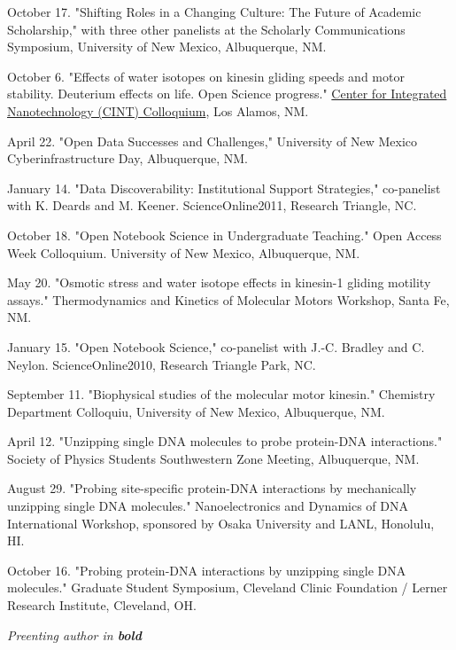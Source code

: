 \documentclass[11pt]{article}
\begin{document}
 October 17. "Shifting Roles in a Changing Culture: The Future of Academic Scholarship," with three other panelists at the Scholarly Communications Symposium, University of New Mexico, Albuquerque, NM.

 October 6. "Effects of water isotopes on kinesin gliding speeds and motor stability.  Deuterium effects on life.  Open Science progress." \href{http://goo.gl/XRjWQ}{Center for Integrated Nanotechnology (CINT) Colloquium}, Los Alamos, NM.

 April 22. "Open Data Successes and Challenges," University of New Mexico Cyberinfrastructure Day, Albuquerque, NM. 

 January 14. "Data Discoverability: Institutional Support Strategies," co-panelist with K. Deards and M. Keener.  ScienceOnline2011, Research Triangle, NC.

 October 18. "Open Notebook Science in Undergraduate Teaching." Open Access Week Colloquium.  University of New Mexico, Albuquerque, NM.

 May 20. "Osmotic stress and water isotope effects in kinesin-1 gliding motility assays."  Thermodynamics and Kinetics of Molecular Motors Workshop, Santa Fe, NM.

 January 15. "Open Notebook Science," co-panelist with J.-C. Bradley and C. Neylon.  ScienceOnline2010, Research Triangle Park, NC.

 September 11. "Biophysical studies of the molecular motor kinesin." Chemistry Department Colloquiu, University of New Mexico, Albuquerque, NM.

 April 12. "Unzipping single DNA molecules to probe protein-DNA interactions." Society of Physics Students Southwestern Zone Meeting, Albuquerque, NM.

 August 29. "Probing site-specific protein-DNA interactions by mechanically unzipping single DNA molecules." Nanoelectronics and Dynamics of DNA International Workshop, sponsored by Osaka University and LANL, Honolulu, HI.

 October 16. "Probing protein-DNA interactions by unzipping single DNA molecules." Graduate Student Symposium, Cleveland Clinic Foundation / Lerner Research Institute, Cleveland, OH.

\bigskip


\medskip
\noindent\emph{Preenting author in \textbf{bold} \vspace{0.05in}}
\end{document}
